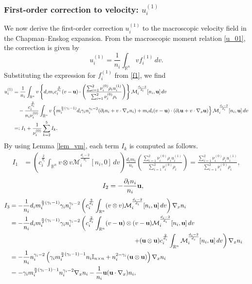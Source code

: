 \documentclass[10pt,reqno]{amsart}
\numberwithin{equation}{section}
\newcommand{\R}{\mathbb R}
\newcommand{\pa}{\partial}
\newcommand{\intr}{\int_{\R^n}}
\begin{document}
\subsubsection*{First-order correction to velocity: $u_i^{(1)}$}
We now derive the first-order correction $u_i^{(1)}$ to the macroscopic velocity field in the Chapman--Enskog expansion. From the macroscopic moment relation \eqref{u_01}, the correction is given by
\[
u_i^{(1)} = \frac{1}{n_i} \int_{\R^n} v f_i^{(1)}\, dv.
\]
Substituting the expression for $f_i^{(1)}$ from \eqref{f1}, we find
\begin{align*}
u_i^{(1)} &=\frac{1}{n_i} \int_{\R^n} v \left\{ d_im_ic_i^{\frac{2}{d_i}}(v-{\bf{u}})\cdot \left( \frac{ \sum_{i=1}^2\nu_i^{(0)} \rho_iu_i^{(1)}}{\sum_{i=1}^2\nu_i^{(0)} \rho_i} \right) \right\}\mathcal{M}_i^{\frac{d_i-2}{d_i}}[n_i,{\bf{u}}]\, dv \cr 
&\quad  -\frac{c_i^{\frac{2}{d_i}}}{n_i\nu_i^{(0)}} \int_{\R^n} v \left\{ 
 m_i^{\frac{n}{2}(\gamma_i - 1)} d_i \gamma_i n_i^{\gamma_i - 2}  (\pa_t n_i + v \cdot \nabla_x n_i) +  m_i d_i (v - {\bf{u}})  \cdot (\pa_t {\bf{u}} + v \cdot \nabla_x {\bf{u}})
\right\}\mathcal{M}_i^{\frac{d_i - 2}{d_i}}[n_i,{\bf{u}}] \,dv \\
&=:I_1+ \frac{1}{\nu_i^{(0)}}\sum_{k=2}^5 I_k.
\end{align*}
By using Lemma \ref{lem_vm}, each term  $I_k$ is computed as follows.
\begin{align*}
I_1&= \left( c_i^{\frac{2}{d_i}}\int_{\R^n} v \otimes  v\mathcal{M}_i^{\frac{d_i-2}{d_i}}[n_i,0]\, dv \right) \frac{d_im_i}{n_i}\left( \frac{ \sum_{i=1}^2\nu_i^{(0)} \rho_iu_i^{(1)}}{\sum_{i=1}^2\nu_i^{(0)} \rho_i} \right)=  \frac{ \sum_{i=1}^2\nu_i^{(0)} \rho_iu_i^{(1)}}{\sum_{i=1}^2\nu_i^{(0)} \rho_i},
\end{align*}
\begin{align*}
I_2&=-   \frac{\pa_tn_i}{n_i}    {\bf{u}},
\end{align*}
\begin{align*}
I_3&=-\frac{1}{n_i}d_i m_i^{\frac n2(\gamma_i - 1)} \gamma_in_i^{\gamma_i-2} \left(c_i^{\frac{2}{d_i}} \intr (v\otimes v)  \mathcal{M}_i^{\frac{d_i-2}{d_i}}[n_i, {\bf{u}}]  \,dv\right) \nabla_x n_i\cr 
&=-\frac{1}{n_i}d_i m_i^{\frac n2(\gamma_i - 1)} \gamma_in_i^{\gamma_i-2} \left(c_i^{\frac{2}{d_i}}\int_{\R^n} (v - {\bf{u}})\otimes (v - {\bf{u}})\mathcal{M}_i^{\frac{d_i - 2}{d_i}}[n_i, {\bf{u}}] \,dv \right.\cr
&\hspace{7cm} \left. + ( {\bf{u}}\otimes {\bf{u}} )c_i^{\frac{2}{d_i}}\int_{\R^n} \mathcal{M}_i^{\frac{d_i - 2}{d_i}}[n_i, {\bf{u}}] \,dv\right) \nabla_x n_i\cr 
&=-\frac{1}{n_i}n_i^{\gamma_i-2}  \left(\gamma_i m_i^{\frac n2(\gamma_i - 1)-1} n_i \mathbb{I}_{n\times n}+ n_i^{2-\gamma_i } ({\bf{u}}\otimes {\bf{u}}) \right)\nabla_x n_i\cr 
&=-\gamma_i m_i^{\frac n2(\gamma_i - 1)-1} n_i^{\gamma_i-2}  \nabla_x n_i-\frac{1}{n_i}{\bf{u}}  ({\bf{u}} \cdot \nabla_x) n_i,
\end{align*}
\end{document}
